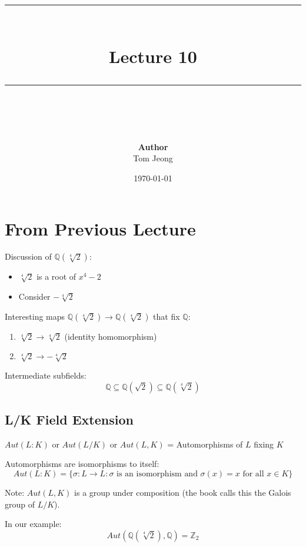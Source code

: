 \documentclass{article}
\newcommand{\HRule}[1]{\rule{\linewidth}{#1}}
\begin{document}
\title{
    \normalsize
    \vspace{2.0cm}
    \HRule{1.5pt} \\[0.4cm]
    \LARGE \textbf{Lecture 10}
    \HRule{2.0pt} \\[0.6cm]
}
\author{
    \textbf{Author} \\
    Tom Jeong
}
\date{\today}

\maketitle
\tableofcontents
\newpage

\section{From Previous Lecture}
Discussion of $\mathbb{Q}(\sqrt[4]{2})$:
\begin{itemize}
    \item $\sqrt[4]{2}$ is a root of $x^4 - 2$
    \item Consider $-\sqrt[4]{2}$
\end{itemize}

Interesting maps $\mathbb{Q}(\sqrt[4]{2}) \to \mathbb{Q}(\sqrt[4]{2})$ that fix $\mathbb{Q}$:
\begin{enumerate}
    \item $\sqrt[4]{2} \to \sqrt[4]{2}$ (identity homomorphism)
    \item $\sqrt[4]{2} \to -\sqrt[4]{2}$
\end{enumerate}

Intermediate subfields:
$$\mathbb{Q} \subseteq \mathbb{Q}(\sqrt{2}) \subseteq \mathbb{Q}(\sqrt[4]{2})$$

\subsection{L/K Field Extension}
$Aut(L:K)$ or $Aut(L/K)$ or $Aut(L,K)$ = Automorphisms of $L$ fixing $K$

\begin{definition}
    Automorphisms are isomorphisms to itself:
    $$Aut(L:K) = \{\sigma: L \to L: \sigma \text{ is an isomorphism} \text{ and } \sigma(x) = x \text{ for all } x \in K \}$$
\end{definition}

Note: $Aut(L,K)$ is a group under composition (the book calls this the Galois group of $L/K$).

In our example: $$Aut(\mathbb{Q}(\sqrt[4]{2}), \mathbb{Q}) = \mathbb{Z}_2$$
\end{document}
